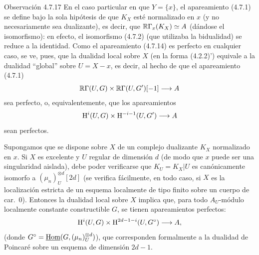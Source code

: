 \begin{statement}{Observación 4.7.17}
En el caso particular en que $Y=\{x\}$, el apareamiento (4.7.1) se define bajo la sola hipótesis de que $K_X$ esté normalizado en $x$ (y no necesariamente sea dualizante), es decir, que $\mathbb{R}\Gamma_x(K_X)\simeq A$ (dándose el isomorfismo): en efecto, el isomorfismo (4.7.2) (que utilizaba la bidualidad) se reduce a la identidad. Como el apareamiento (4.7.14) es perfecto en cualquier caso, se ve, pues, que la dualidad local sobre $X$ (en la forma (4.2.2)') equivale a la dualidad \textquotedblleft global\textquotedblright{} sobre $U=X-x$, es decir, al hecho de que el apareamiento (4.7.1)
\[
\mathbb{R}\Gamma(U,G)\times\mathbb{R}\Gamma(U,G')[-1]\longrightarrow A
\]
sea perfecto, o, equivalentemente, que los apareamientos
\[
\mathrm{H}^i(U,G)\times\mathrm{H}^{-i-1}(U,G')\longrightarrow A
\]
sean perfectos.

Supongamos que se dispone sobre $X$ de un complejo dualizante $K_X$ normalizado en $x$. Si $X$ es excelente y $U$ regular de dimensión $d$ (de modo que $x$ puede ser una singularidad aislada), debe poder verificarse que $K_U=K_X|U$ es canónicamente isomorfo a $(\mu_n)_U^{\otimes d}[2d]$ (se verifica fácilmente, en todo caso, si $X$ es la localización estricta de un esquema localmente de tipo finito sobre un cuerpo de car.~0). Entonces la dualidad local sobre $X$ implica que, para todo $A_U$-módulo localmente constante constructible $G$, se tienen apareamientos perfectos:
\[
\mathrm{H}^i(U,G)\times\mathrm{H}^{2d-1-i}(U,G^\circ)\longrightarrow A,
\]
(donde $G^\circ=\underline{\operatorname{Hom}}(G,(\mu_n)_U^{\otimes d})$), que corresponden formalmente a la dualidad de Poincaré sobre un esquema de dimensión $2d-1$.
\end{statement}
